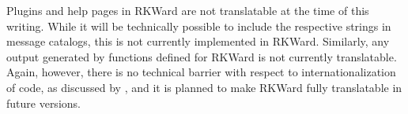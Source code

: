 Plugins and help pages in RKWard are not translatable at the time of this
writing. While it will be technically possible to include the respective strings in
message catalogs, this is not currently implemented in RKWard. Similarly, any
output generated by  functions defined for RKWard is not currently
translatable. Again, however, there is no technical barrier with respect to
internationalization of  code, as discussed by \cite{Ripley2005a},
and it is planned to make RKWard fully translatable in future versions.
